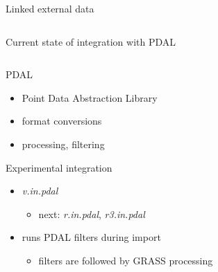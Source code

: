 \documentclass[xcolor={dvipsnames,usenames},beamer,aspectratio=169]{beamer}
\newcommand{\module}[1]{\emph{#1}}
\begin{document}
\begin{frame}{Linked external data}
\begin{columns}
\begin{column}{0.5\textwidth}
\end{column}
\end{columns}

\end{frame}

\begin{frame}{Current state of integration with PDAL}

\begin{columns}
\begin{column}{0.5\textwidth}

\begin{block}{PDAL}
 \begin{itemize}
  \item Point Data Abstraction Library
  \item format conversions
  \item processing, filtering
 \end{itemize}
\end{block}

\begin{block}{Experimental integration}
 \begin{itemize}
  \item \module{v.in.pdal}
  \begin{itemize}
    \item next: \module{r.in.pdal}, \module{r3.in.pdal}
  \end{itemize}
  \item runs PDAL filters during import
  \begin{itemize}
    \item filters are followed by GRASS processing
  \end{itemize}
 \end{itemize}
\end{block}

\end{column}
\begin{column}{0.25\textwidth}


\end{column}
\end{columns}
\end{frame}
\end{document}
